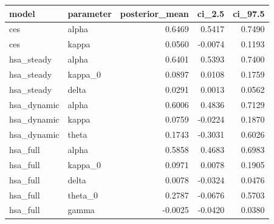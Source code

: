 \begin{tabular}{llrrr}
\toprule
model & parameter & posterior\_mean & ci\_2.5 & ci\_97.5 \\
\midrule
ces & alpha & 0.6469 & 0.5417 & 0.7490 \\
ces & kappa & 0.0560 & -0.0074 & 0.1193 \\
hsa\_steady & alpha & 0.6401 & 0.5393 & 0.7400 \\
hsa\_steady & kappa\_0 & 0.0897 & 0.0108 & 0.1759 \\
hsa\_steady & delta & 0.0291 & 0.0013 & 0.0562 \\
hsa\_dynamic & alpha & 0.6006 & 0.4836 & 0.7129 \\
hsa\_dynamic & kappa & 0.0759 & -0.0224 & 0.1870 \\
hsa\_dynamic & theta & 0.1743 & -0.3031 & 0.6026 \\
hsa\_full & alpha & 0.5858 & 0.4683 & 0.6983 \\
hsa\_full & kappa\_0 & 0.0971 & 0.0078 & 0.1905 \\
hsa\_full & delta & 0.0078 & -0.0324 & 0.0476 \\
hsa\_full & theta\_0 & 0.2787 & -0.0676 & 0.5703 \\
hsa\_full & gamma & -0.0025 & -0.0420 & 0.0380 \\
\bottomrule
\end{tabular}
